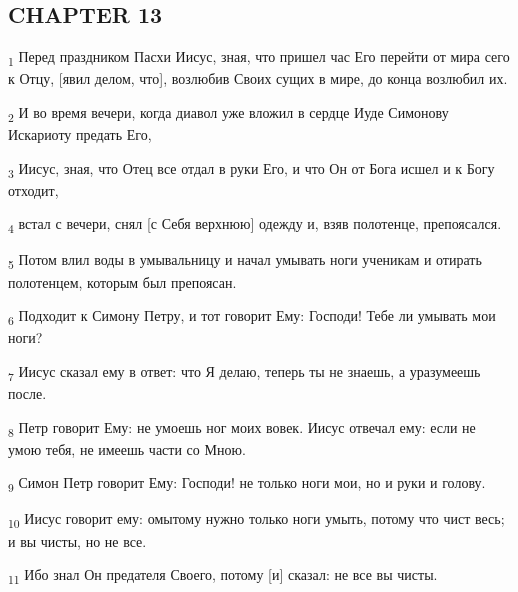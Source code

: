 \subsection{CHAPTER 13}
\begin{tcolorbox}
\textsubscript{1} Перед праздником Пасхи Иисус, зная, что пришел час Его перейти от мира сего к Отцу, [явил делом, что], возлюбив Своих сущих в мире, до конца возлюбил их.
\end{tcolorbox}
\begin{tcolorbox}
\textsubscript{2} И во время вечери, когда диавол уже вложил в сердце Иуде Симонову Искариоту предать Его,
\end{tcolorbox}
\begin{tcolorbox}
\textsubscript{3} Иисус, зная, что Отец все отдал в руки Его, и что Он от Бога исшел и к Богу отходит,
\end{tcolorbox}
\begin{tcolorbox}
\textsubscript{4} встал с вечери, снял [с Себя верхнюю] одежду и, взяв полотенце, препоясался.
\end{tcolorbox}
\begin{tcolorbox}
\textsubscript{5} Потом влил воды в умывальницу и начал умывать ноги ученикам и отирать полотенцем, которым был препоясан.
\end{tcolorbox}
\begin{tcolorbox}
\textsubscript{6} Подходит к Симону Петру, и тот говорит Ему: Господи! Тебе ли умывать мои ноги?
\end{tcolorbox}
\begin{tcolorbox}
\textsubscript{7} Иисус сказал ему в ответ: что Я делаю, теперь ты не знаешь, а уразумеешь после.
\end{tcolorbox}
\begin{tcolorbox}
\textsubscript{8} Петр говорит Ему: не умоешь ног моих вовек. Иисус отвечал ему: если не умою тебя, не имеешь части со Мною.
\end{tcolorbox}
\begin{tcolorbox}
\textsubscript{9} Симон Петр говорит Ему: Господи! не только ноги мои, но и руки и голову.
\end{tcolorbox}
\begin{tcolorbox}
\textsubscript{10} Иисус говорит ему: омытому нужно только ноги умыть, потому что чист весь; и вы чисты, но не все.
\end{tcolorbox}
\begin{tcolorbox}
\textsubscript{11} Ибо знал Он предателя Своего, потому [и] сказал: не все вы чисты.
\end{tcolorbox}

